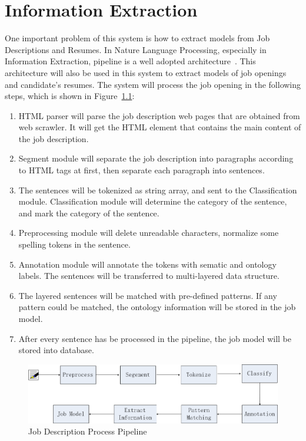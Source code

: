 \chapter{Information Extraction}

One important problem of this system is how to extract models from Job Descriptions and Resumes.
In Nature Language Processing, especially in Information Extraction, pipeline is a well adopted architecture~\cite{sarawagi2008information}. This architecture will also be used in this system to extract models of job openings and candidate's resumes. The system will process the job opening in the following steps, which is shown in Figure~\ref{fig:Pipeline}:

\begin{enumerate}
    \item HTML parser will parse the job description web pages that are obtained from web scrawler. It will get the HTML element that contains the main content of the job description.
    \item Segment module will separate the job description into paragraphs according to HTML tags at first, then separate each paragraph into sentences.
    \item The sentences will be tokenized as string array, and sent to the Classification module. Classification module will determine the category of the sentence, and mark the category of the sentence.
    \item Preprocessing module will delete unreadable characters, normalize some spelling tokens in the sentence.
    \item Annotation module will annotate the tokens with sematic and ontology labels. The sentences will be transferred to multi-layered data structure.
    \item The layered sentences will be matched with pre-defined patterns. If any pattern could be matched, the ontology information will be stored in the job model.
    \item After every sentence has be processed in the pipeline, the job model will be stored into database.
\end{enumerate}


\begin{figure}[htbp]
  \centering
  \includegraphics[scale=0.4]{images/pipeline.png}
  \caption{Job Description Process Pipeline}
  \label{fig:Pipeline}
\end{figure}
